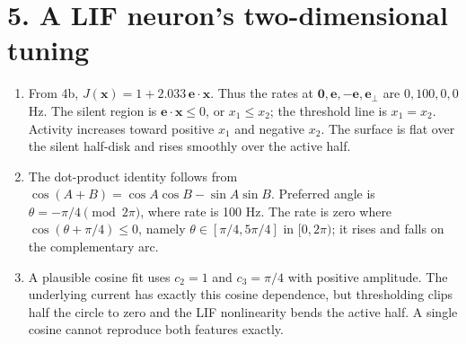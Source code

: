 \documentclass[10pt,letterpaper]{article}
\newcommand{\vct}[1]{\boldsymbol{#1}}
\begin{document}
\section*{5. A LIF neuron's two-dimensional tuning}
\begin{enumerate}[label=\textbf{5\alph*.}]
\item From 4b, \(J(\vct{x})=1+2.033\,\vct{e}\cdot\vct{x}\). Thus the rates at \(\vct{0},\vct{e},-\vct{e},\vct{e}_{\perp}\) are \(0,100,0,0\) Hz. The silent region is \(\vct{e}\cdot\vct{x}\leq0\), or \(x_1\leq x_2\); the threshold line is \(x_1=x_2\). Activity increases toward positive \(x_1\) and negative \(x_2\). The surface is flat over the silent half-disk and rises smoothly over the active half.
\begin{center}\end{center}
\item The dot-product identity follows from \(\cos(A+B)=\cos A\cos B-\sin A\sin B\). Preferred angle is \(\theta=-\pi/4\pmod{2\pi}\), where rate is 100 Hz. The rate is zero where \(\cos(\theta+\pi/4)\leq0\), namely \(\theta\in[\pi/4,5\pi/4]\) in \([0,2\pi)\); it rises and falls on the complementary arc.
\item A plausible cosine fit uses \(c_2=1\) and \(c_3=\pi/4\) with positive amplitude. The underlying current has exactly this cosine dependence, but thresholding clips half the circle to zero and the LIF nonlinearity bends the active half. A single cosine cannot reproduce both features exactly.
\end{enumerate}
\end{document}
